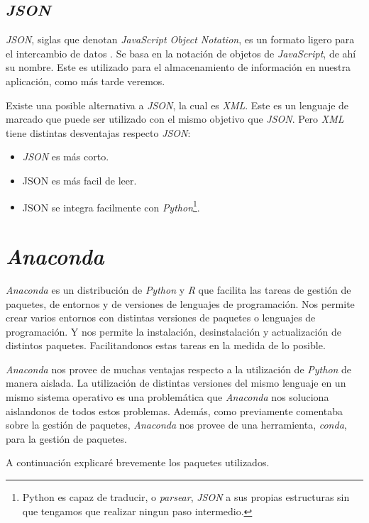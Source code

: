 \subsection{\textit{JSON}}
\textit{JSON}, siglas que denotan \textit{JavaScript Object Notation}, es un formato ligero para el intercambio de datos \cite{json}. Se basa en la notación de objetos de \textit{JavaScript}, de ahí su nombre. Este es utilizado para el almacenamiento de información en nuestra aplicación, como más tarde veremos.

Existe una posible alternativa a \textit{JSON}, la cual es \textit{XML}. Este es un lenguaje de marcado que puede ser utilizado con el mismo objetivo que \textit{JSON}. Pero \textit{XML} tiene distintas desventajas respecto \textit{JSON}:

\begin{itemize}
	\item \textit{JSON} es más corto.
	\item JSON es más facil de leer.
	\item JSON se integra facilmente con \textit{Python}\footnote{Python es capaz de traducir, o \textit{parsear}, \textit{JSON} a sus propias estructuras sin que tengamos que realizar ningun paso intermedio.}.
\end{itemize}
\section{\textit{Anaconda}}

\textit{Anaconda} es un distribución de \textit{Python} y \textit{R} que facilita las tareas de gestión de paquetes, de entornos y de versiones de lenguajes de programación. Nos permite crear varios entornos con distintas versiones de paquetes o lenguajes de programación. Y nos permite la instalación, desinstalación y actualización de distintos paquetes. Facilitandonos estas tareas en la medida de lo posible.
 
\textit{Anaconda} nos provee de muchas ventajas respecto a la utilización de \textit{Python} de manera aislada. La utilización de distintas versiones del mismo lenguaje en un mismo sistema operativo es una problemática que \textit{Anaconda} nos soluciona aislandonos de todos estos problemas. Además, como previamente comentaba sobre la gestión de paquetes, \textit{Anaconda} nos provee de una herramienta, \textit{conda}, para la gestión de paquetes.

A continuación explicaré brevemente los paquetes utilizados.
 
